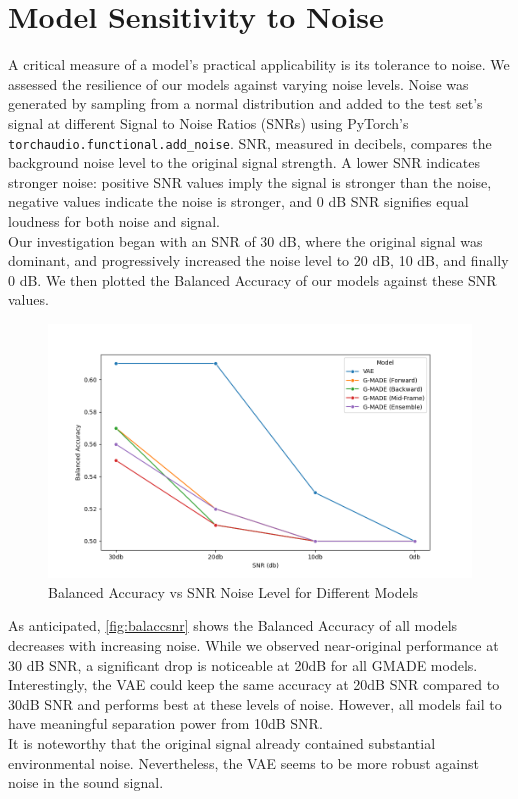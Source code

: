 \section{Model Sensitivity to Noise}
A critical measure of a model's practical applicability is its tolerance to noise. We assessed the resilience of our models against varying noise levels. Noise was generated by sampling from a normal distribution and added to the test set's signal at different Signal to Noise Ratios (SNRs) using PyTorch's \lstinline{torchaudio.functional.add_noise}. SNR, measured in decibels, compares the background noise level to the original signal strength. A lower SNR indicates stronger noise: positive SNR values imply the signal is stronger than the noise, negative values indicate the noise is stronger, and 0 dB SNR signifies equal loudness for both noise and signal.\\
Our investigation began with an SNR of 30 dB, where the original signal was dominant, and progressively increased the noise level to 20 dB, 10 dB, and finally 0 dB. We then plotted the Balanced Accuracy of our models against these SNR values.
\begin{figure}[h!]
    \includegraphics[width=\linewidth]{images/snr_balacc}
    \caption{
    Balanced Accuracy vs SNR Noise Level for Different Models
}
\label{fig:balaccsnr}
\end{figure}

As anticipated, \autoref{fig:balaccsnr} shows the Balanced Accuracy of all models decreases with increasing noise. While we observed near-original performance at 30 dB SNR, a significant drop is noticeable at 20dB for all GMADE models. Interestingly, the VAE could keep the same accuracy at 20dB SNR compared to 30dB SNR and performs best at these levels of noise. However, all models fail to have meaningful separation power from 10dB SNR.\\
It is noteworthy that the original signal already contained substantial environmental noise. Nevertheless, the VAE seems to be more robust against noise in the sound signal.
